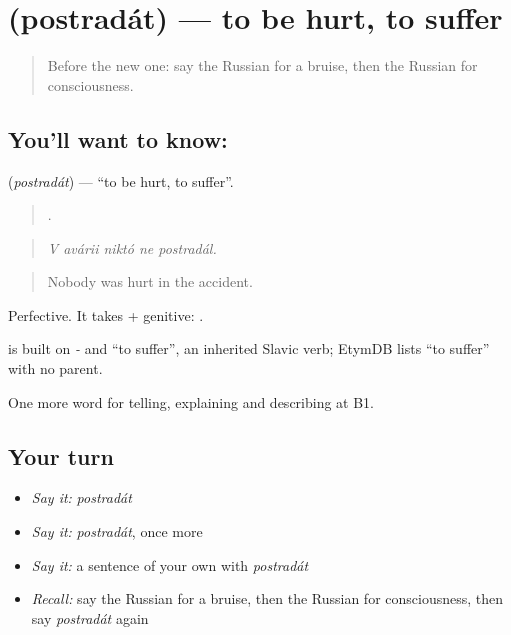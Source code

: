 \section[\texorpdfstring{\ru{пострадать} (postradát)}{пострадать (postradát)}]{ (postradát) — to be hurt, to suffer}

\label{lesson:RU-C297-postradat}



\begin{quote}
Before the new one: say the Russian for a bruise, then the Russian for consciousness.
\end{quote}

\subsection*{You'll want to know: }
\textbf{} (\emph{postradát}) — \textquotedblleft{}to be hurt, to suffer\textquotedblright{}.

\begin{quote}
    .
\end{quote}

\begin{quote}
\emph{V avárii niktó ne postradál.}
\end{quote}

\begin{quote}
Nobody was hurt in the accident.
\end{quote}

Perfective. It takes \emph{} + genitive: \emph{  }.

\begin{cousinweb}
\emph{} is built on \emph{-} and \emph{} \textquotedblleft{}to suffer\textquotedblright{}, an inherited Slavic verb; EtymDB lists \emph{} \textquotedblleft{}to suffer\textquotedblright{} with no parent.
\end{cousinweb}

\begin{grammarlens}[title={What you've built}]
One more word for telling, explaining and describing at B1.
\end{grammarlens}

\subsection*{Your turn}
\begin{itemize}
\raggedright
  \item \emph{Say it:} \emph{postradát}
  \item \emph{Say it:} \emph{postradát}, once more
  \item \emph{Say it:} a sentence of your own with \emph{postradát}
  \item \emph{Recall:} say the Russian for a bruise, then the Russian for consciousness, then say \emph{postradát} again
\end{itemize}

